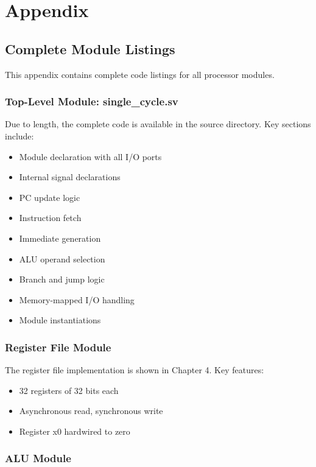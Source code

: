 \chapter{Appendix}

\section{Complete Module Listings}

This appendix contains complete code listings for all processor modules.

\subsection{Top-Level Module: single\_cycle.sv}

Due to length, the complete code is available in the source directory. Key sections include:

\begin{itemize}
    \item Module declaration with all I/O ports
    \item Internal signal declarations
    \item PC update logic
    \item Instruction fetch
    \item Immediate generation
    \item ALU operand selection
    \item Branch and jump logic
    \item Memory-mapped I/O handling
    \item Module instantiations
\end{itemize}

\subsection{Register File Module}

The register file implementation is shown in Chapter 4. Key features:

\begin{itemize}
    \item 32 registers of 32 bits each
    \item Asynchronous read, synchronous write
    \item Register x0 hardwired to zero
\end{itemize}

\subsection{ALU Module}


